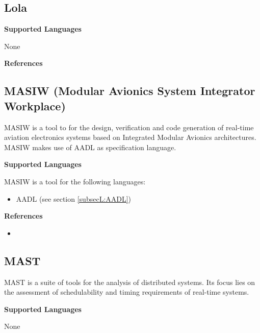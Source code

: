 \subsection{Lola}
\label{subsecT:Lola}



\textbf{Supported Languages}

None


\textbf{References}




\subsection{MASIW (Modular Avionics System Integrator Workplace)}
\label{subsecT:MASIW}


MASIW is a tool to for  the design, verification and code generation of real-time aviation electronics systems based on Integrated Modular Avionics architectures. MASIW makes use of AADL as specification language.

\textbf{Supported Languages}

MASIW is a tool for the following languages:
\begin{itemize}
	\item AADL (see section \ref{subsecL:AADL})
\end{itemize}


\textbf{References}
\begin{itemize}
	
\item {}
\end{itemize}



\subsection{MAST}
\label{subsecT:MAST}


MAST is a suite of tools for the analysis of distributed systems. Its focus lies on the assessment of schedulability and timing requirements of real-time systems.

\textbf{Supported Languages}

None



